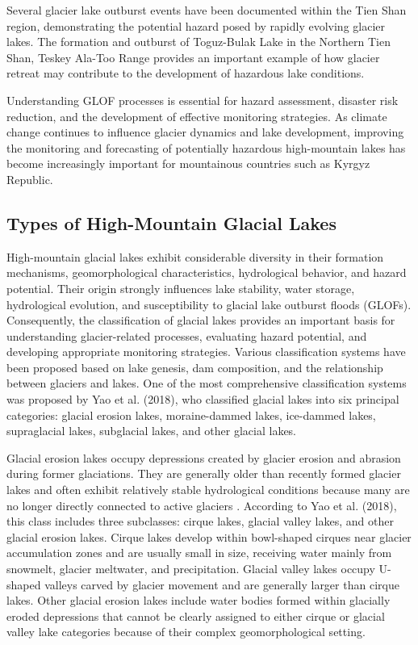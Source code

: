 \documentclass[12pt,a4paper]{report}
\begin{document}
Several glacier lake outburst events have been documented within the Tien Shan region, demonstrating the potential hazard posed by rapidly evolving glacier lakes. The formation and outburst of Toguz-Bulak Lake in the Northern Tien Shan, Teskey Ala-Too Range \cite{Daiyrov2020} provides an important example of how glacier retreat may contribute to the development of hazardous lake conditions. 

Understanding GLOF processes is essential for hazard assessment, disaster risk reduction, and the development of effective monitoring strategies. As climate change continues to influence glacier dynamics and lake development, improving the monitoring and forecasting of potentially hazardous high-mountain lakes has become increasingly important for mountainous countries such as Kyrgyz Republic. 

\subsection{Types of High-Mountain Glacial Lakes}

High-mountain glacial lakes exhibit considerable diversity in their formation mechanisms, geomorphological characteristics, hydrological behavior, and hazard potential. Their origin strongly influences lake stability, water storage, hydrological evolution, and susceptibility to glacial lake outburst floods (GLOFs). Consequently, the classification of glacial lakes provides an important basis for understanding glacier-related processes, evaluating hazard potential, and developing appropriate monitoring strategies. Various classification systems have been proposed based on lake genesis, dam composition, and the relationship between glaciers and lakes. One of the most comprehensive classification systems was proposed by Yao et al. (2018), who classified glacial lakes into six principal categories: glacial erosion lakes, moraine-dammed lakes, ice-dammed lakes, supraglacial lakes, subglacial lakes, and other glacial lakes.

Glacial erosion lakes occupy depressions created by glacier erosion and abrasion during former glaciations. They are generally older than recently formed glacier lakes and often exhibit relatively stable hydrological conditions because many are no longer directly connected to active glaciers \cite{Yao2018}. According to Yao et al. (2018), this class includes three subclasses: cirque lakes, glacial valley lakes, and other glacial erosion lakes. Cirque lakes develop within bowl-shaped cirques near glacier accumulation zones and are usually small in size, receiving water mainly from snowmelt, glacier meltwater, and precipitation. Glacial valley lakes occupy U-shaped valleys carved by glacier movement and are generally larger than cirque lakes. Other glacial erosion lakes include water bodies formed within glacially eroded depressions that cannot be clearly assigned to either cirque or glacial valley lake categories because of their complex geomorphological setting.
\end{document}

